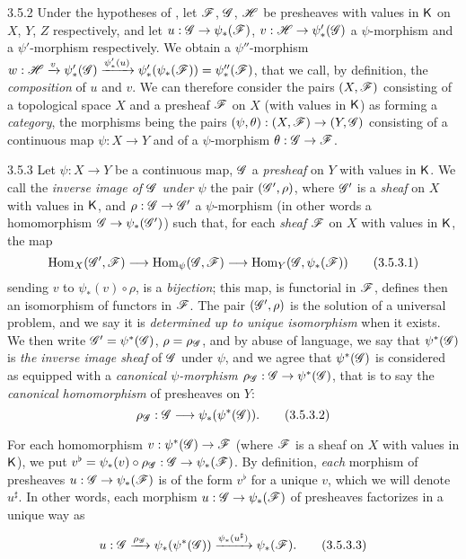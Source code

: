 \begin{env}{3.5.2}
\label{env-0.3.5.2}
Under the hypotheses of , let $\mathscr{F}$, $\mathscr{G}$, $\mathscr{H}$ be presheaves
with values in $\mathsf{K}$ on $X$, $Y$, $Z$ respectively, and let $u:\mathscr{G}\to\psi_*(\mathscr{F})$,
$v:\mathscr{H}\to\psi_*'(\mathscr{G})$ a $\psi$-morphism and a $\psi'$-morphism respectively. We obtain
a $\psi''$-morphism
$w:\mathscr{H}\xrightarrow{v}\psi_*'(\mathscr{G})\xrightarrow{\psi_*'(u)}
\psi_*'(\psi_*(\mathscr{F}))=\psi_*''(\mathscr{F})$, that we call, by definition, the
\emph{composition} of $u$ and $v$. We can therefore consider the pairs $(X,\mathscr{F})$
consisting of a topological space $X$ and a presheaf $\mathscr{F}$ on $X$ (with values in $\mathsf{K}$) as
forming a \emph{category}, the morphisms being the pairs
$(\psi,\theta):(X,\mathscr{F})\to(Y,\mathscr{G})$ consisting of a continuous map $\psi:X\to Y$ and
of a $\psi$-morphism $\theta:\mathscr{G}\to\mathscr{F}$.
\end{env}

\begin{env}{3.5.3}
\label{env-0.3.5.3}
Let $\psi:X\to Y$ be a continuous map, $\mathscr{G}$ a \emph{presheaf} on $Y$ with values in $\mathsf{K}$.
We call the \emph{inverse image of $\mathscr{G}$ under $\psi$} the pair $(\mathscr{G}',\rho)$, where
$\mathscr{G}'$ is a \emph{sheaf} on $X$ with values in $\mathsf{K}$, and $\rho:\mathscr{G}\to\mathscr{G}'$ a
$\psi$-morphism (in other words a homomorphism $\mathscr{G}\to\psi_*(\mathscr{G}')$) such that, for
each \emph{sheaf} $\mathscr{F}$ on $X$ with values in $\mathsf{K}$, the map
\[
  {\mathop{\mathrm{Hom}}\nolimits}_X(\mathscr{G}',\mathscr{F})\longrightarrow{\mathop{\mathrm{Hom}}\nolimits}_\psi(\mathscr{G},\mathscr{F})
  \longrightarrow{\mathop{\mathrm{Hom}}\nolimits}_Y(\mathscr{G},\psi_*(\mathscr{F}))
  \tag{3.5.3.1}
\]
sending $v$ to $\psi_*(v)\circ\rho$, is a \emph{bijection}; this map, is functorial in
$\mathscr{F}$, defines then an isomorphism of functors in $\mathscr{F}$. The pair $(\mathscr{G}',\rho)$
is the solution of a universal problem, and we say it is \emph{determined up to unique
isomorphism} when it exists. We then write $\mathscr{G}'=\psi^*(\mathscr{G})$, $\rho=\rho_\mathscr{G}$, and
by abuse of language, we say that $\psi^*(\mathscr{G})$ is \emph{the inverse image sheaf} of
$\mathscr{G}$ under $\psi$, and we agree that $\psi^*(\mathscr{G})$ is considered as equipped with a
\emph{canonical $\psi$-morphism $\rho_\mathscr{G}:\mathscr{G}\to\psi^*(\mathscr{G})$}, that is to say the
\emph{canonical homomorphism} of presheaves on $Y$:
\[
  \rho_\mathscr{G}:\mathscr{G}\longrightarrow\psi_*(\psi^*(\mathscr{G})).
  \tag{3.5.3.2}
\]

For each homomorphism $v:\psi^*(\mathscr{G})\to\mathscr{F}$ (where $\mathscr{F}$ is a sheaf on $X$ with
values in $\mathsf{K}$), we put $v^\flat=\psi_*(v)\circ\rho_\mathscr{G}:\mathscr{G}\to\psi_*(\mathscr{F})$. By
definition, \emph{each} morphism of presheaves $u:\mathscr{G}\to\psi_*(\mathscr{F})$ is of the form
$v^\flat$ for a unique $v$, which we will denote $u^\sharp$. In other words, each morphism
$u:\mathscr{G}\to\psi_*(\mathscr{F})$ of presheaves factorizes in a unique way as
\[
  u:\mathscr{G}\xrightarrow{\rho_\mathscr{G}}\psi_*(\psi^*(\mathscr{G}))
  \xrightarrow{\psi_*(u^\sharp)}\psi_*(\mathscr{F}).
  \tag{3.5.3.3}
\]
\end{env}

